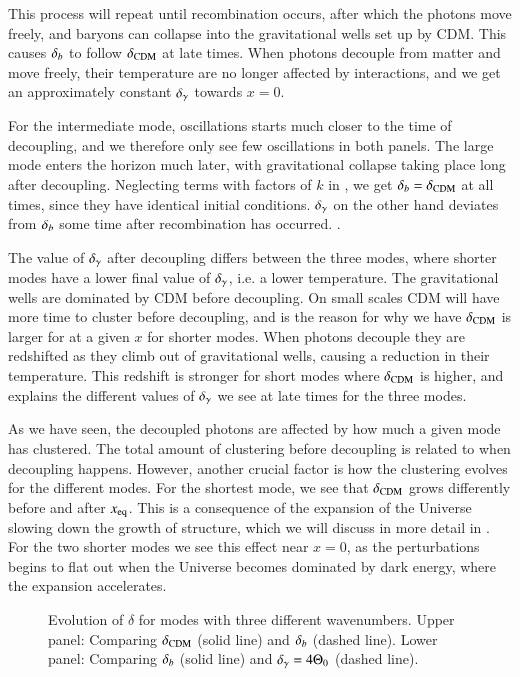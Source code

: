 This process will repeat until recombination occurs, after which the photons move freely, and baryons can collapse into the gravitational wells set up by CDM. This causes $\delta_b$ to follow $\delta_\mathrm{CDM}$ at late times. When photons decouple from matter and move freely, their temperature are no longer affected by interactions, and we get an approximately constant $\delta_\gamma$ towards $x=0$.  

For the intermediate mode, oscillations starts much closer to the time of decoupling, and we therefore only see few oscillations in both panels. The large mode enters the horizon much later, with gravitational collapse taking place long after decoupling. Neglecting terms with factors of $k$ in , we get $\delta_b=\delta_\mathrm{CDM}$ at all times, since they have identical initial conditions. $\delta_\gamma$ on the other hand deviates from $\delta_b$ some time after recombination has occurred. . 

The value of $\delta_\gamma$ after decoupling differs between the three modes, where shorter modes have a lower final value of $\delta_\gamma$, i.e. a lower temperature. The gravitational wells are dominated by CDM before decoupling. On small scales CDM will have more time to cluster before decoupling, and is the reason for why we have $\delta_\mathrm{CDM}$ is larger for at a given $x$ for shorter modes. When photons decouple they are redshifted as they climb out of gravitational wells, causing a reduction in their temperature. This redshift is stronger for short modes where $\delta_\mathrm{CDM}$ is higher, and explains the different values of $\delta_\gamma$ we see at late times for the three modes. 

As we have seen, the decoupled photons are affected by how much a given mode has clustered. The total amount of clustering before decoupling is related to when decoupling happens. However, another crucial factor is how the clustering evolves for the different modes. For the shortest mode, we see that $\delta_\mathrm{CDM}$ grows differently before and after $x_\mathrm{eq}$. This is a consequence of the expansion of the Universe slowing down the growth of structure, which we will discuss in more detail in . For the two shorter modes we see this effect near $x=0$, as the perturbations begins to flat out when the Universe becomes dominated by dark energy, where the expansion accelerates. 

\begin{figure}[ht!]
    \caption{Evolution of $\delta$ for modes with three different wavenumbers. Upper panel: Comparing $\delta_\mathrm{CDM}$ (solid line) and $\delta_b$ (dashed line). Lower panel: Comparing $\delta_b$ (solid line) and $\delta_\gamma=4\Theta_0$ (dashed line).}
    \label{fig:M3:results:deltas}
\end{figure}


